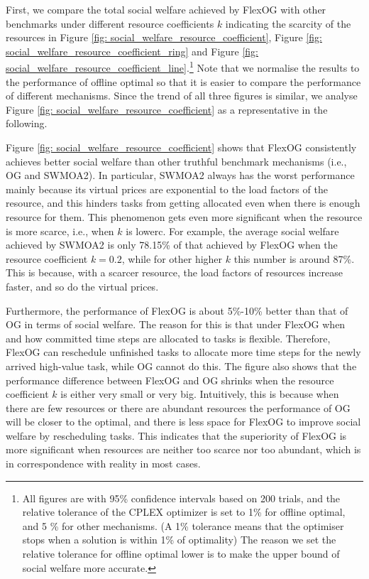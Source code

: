 \documentclass[11pt]{phdthesis}
\begin{document}
First, we compare the total social welfare achieved by FlexOG with other benchmarks under different resource coefficients $ k $ indicating the scarcity of the resources in Figure \ref{fig: social_welfare_resource_coefficient}, Figure \ref{fig: social_welfare_resource_coefficient_ring} and Figure \ref{fig: social_welfare_resource_coefficient_line}.\footnote{All figures are with 95\% confidence intervals based on 200 trials, and the relative tolerance of the CPLEX optimizer is set to 1\% for offline optimal, and 5 \% for other mechanisms. (A 1\% tolerance means that the optimiser stops when a solution is within 1\% of optimality) The reason we set the relative tolerance for offline optimal lower is to make the upper bound of social welfare more accurate.} Note that we normalise the results to the performance of offline optimal so that it is easier to compare the performance of different mechanisms. Since the trend of all three figures is similar, we analyse Figure \ref{fig: social_welfare_resource_coefficient} as a representative in the following. 

Figure \ref{fig: social_welfare_resource_coefficient} shows that FlexOG consistently achieves better social welfare than other truthful benchmark mechanisms (i.e., OG and SWMOA2). In particular, SWMOA2 always has the worst performance mainly because its virtual prices are exponential to the load factors of the resource, and this hinders tasks from getting allocated even when there is enough resource for them. This phenomenon gets even more significant when the resource is more scarce, i.e., when $k$ is lowerc. For example, the average social welfare achieved by SWMOA2 is only 78.15\% of that achieved by FlexOG when the resource coefficient $ k = 0.2 $, while for other higher $ k $ this number is around 87\%. This is because, with a scarcer resource, the load factors of resources increase faster, and so do the virtual prices.

Furthermore, the performance of FlexOG is about 5\%-10\% better than that of OG in terms of social welfare. The reason for this is that under FlexOG when and how committed time steps are allocated to tasks is flexible. Therefore, FlexOG can reschedule unfinished tasks to allocate more time steps for the newly arrived high-value task, while OG cannot do this. The figure also shows that the performance difference between FlexOG and OG shrinks when the resource coefficient $ k $ is either very small or very big. Intuitively, this is because when there are few resources or there are abundant resources the performance of OG will be closer to the optimal, and there is less space for FlexOG to improve social welfare by rescheduling tasks. This indicates that the superiority of FlexOG is more significant when resources are neither too scarce nor too abundant, which is in correspondence with reality in most cases.
\end{document}
